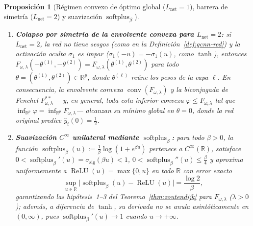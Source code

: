 \documentclass[a4paper,openany,oneside,10pt]{report}
\theoremstyle{pnlTeorema}
\newtheorem{proposicion}{Proposición}[section]
\theoremstyle{pnlDefinicion}
\theoremstyle{pnlObservacion}
\begin{document}
\begin{proposicion}[Régimen convexo de óptimo global ($L_{\mathrm{net}}=1$), barrera de simetría ($L_{\mathrm{net}}=2$) y suavización $\operatorname{softplus}_\beta$]
\begin{enumerate}
\item \textbf{Colapso por simetría de la envolvente convexa para $L_{\mathrm{net}}=2$:} si $L_{\mathrm{net}}=2$, la red no tiene sesgos (como en la Definición~\ref{def:gcnn-red}) y la activación oculta $\sigma_1$ es impar ($\sigma_1(-u)=-\sigma_1(u)$, como $\tanh$), entonces $F_{\omega,\lambda}(-\theta^{(1)},-\theta^{(2)})=F_{\omega,\lambda}(\theta^{(1)},\theta^{(2)})$ para todo $\theta=(\theta^{(1)},\theta^{(2)})\in\mathbb{R}^p$, donde $\theta^{(\ell)}$ reúne los pesos de la capa $\ell$. En consecuencia, la envolvente convexa $\operatorname{conv}(F_{\omega,\lambda})$ y la biconjugada de Fenchel $F_{\omega,\lambda}^{**}$ —y, en general, toda cota inferior convexa $\varphi\le F_{\omega,\lambda}$ tal que $\inf_{\mathbb{R}^p}\varphi=\inf_{\mathbb{R}^p} F_{\omega,\lambda}$— alcanzan su mínimo global en $\theta=0$, donde la red original predice $\hat y_i(0)=\frac12$.
\item \textbf{Suavización $C^\infty$ unilateral mediante $\operatorname{softplus}_\beta$:} para todo $\beta>0$, la función $\operatorname{softplus}_\beta(u):=\frac1\beta\log(1+e^{\beta u})$ pertenece a $C^\infty(\mathbb{R})$, satisface $0<\operatorname{softplus}_\beta'(u)=\sigma_{\mathrm{sig}}(\beta u)<1$, $0<\operatorname{softplus}_\beta''(u)\le\frac\beta4$ y aproxima uniformemente a $\operatorname{ReLU}(u)=\max\{0,u\}$ en todo $\mathbb{R}$ con error exacto
\[
\sup_{u\in\mathbb{R}}\bigl|\operatorname{softplus}_\beta(u)-\operatorname{ReLU}(u)\bigr|=\frac{\log 2}{\beta},
\]
garantizando las hipótesis~1--3 del Teorema~\ref{thm:zoutendijk} para $F_{\omega,\lambda}$ ($\lambda>0$); además, a diferencia de $\tanh$, su derivada no se anula asintóticamente en $(0,\infty)$, pues $\operatorname{softplus}_\beta'(u)\to1$ cuando $u\to+\infty$.
\end{enumerate}
\end{proposicion}
\end{document}

